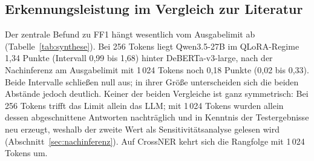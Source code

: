 \subsection{Erkennungsleistung im Vergleich zur Literatur}
\label{sec:disk-leistung}

Der zentrale Befund zu FF1 hängt wesentlich vom Ausgabelimit ab
(Tabelle~\ref{tab:synthese}). Bei 256 Tokens liegt Qwen3.5-27B im
QLoRA-Regime 1,34 Punkte (Intervall 0,99 bis 1,68) hinter
DeBERTa-v3-large, nach der Nachinferenz am Ausgabelimit mit 1\,024 Tokens
noch 0,18 Punkte (0,02 bis 0,33). Beide Intervalle schließen null aus;
in ihrer Größe unterscheiden sich die beiden Abstände jedoch deutlich.
Keiner der beiden Vergleiche ist ganz symmetrisch: Bei 256 Tokens trifft
das Limit allein das LLM; mit 1\,024 Tokens wurden allein dessen
abgeschnittene Antworten nachträglich und in Kenntnis der Testergebnisse
neu erzeugt, weshalb der zweite Wert als Sensitivitätsanalyse gelesen
wird (Abschnitt~\ref{sec:nachinferenz}).
Auf CrossNER kehrt sich die Rangfolge mit 1\,024 Tokens um.

\begin{table}[htbp]
  \centering
  \footnotesize
  \caption[Synthese der vier Bedingungen]{Mikro-F$_1$ von DeBERTa-v3-large
  und Qwen3.5-27B (QLoRA) auf MultiNERD und CrossNER bei 256 und 1\,024
  Ausgabetokens; Vorsprung des Encoders mit 95-\%-Bootstrap-Intervall.}
  \label{tab:synthese}
  \setlength{\tabcolsep}{4pt}
  
\end{table}

